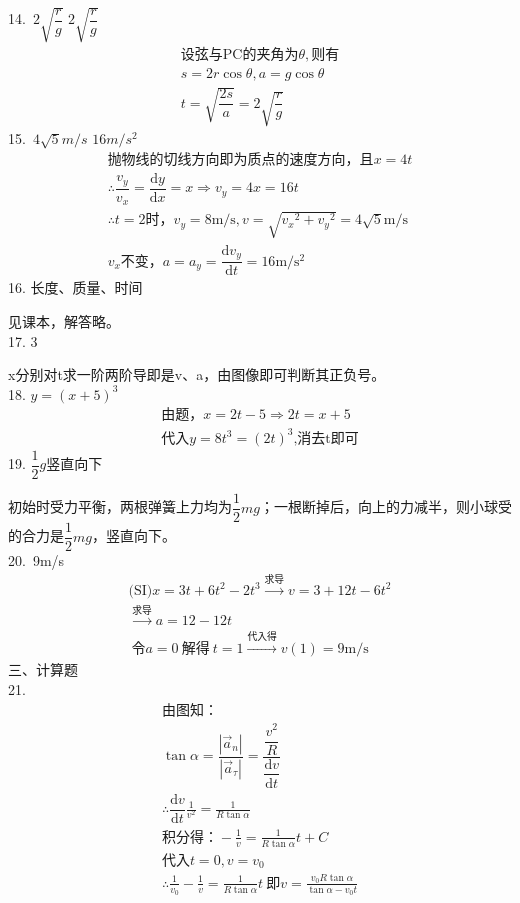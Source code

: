 \documentclass[a4paper,fleqn,twocolumn]{ctexart}
\newcommand{\di}[1]{\mathrm{d}#1}%
\newcommand{\dy}[2]{\dfrac{\di{#1}}{\di{#2}}}%
\begin{document}
		14.\ $2\sqrt{\dfrac{r}{g}}$ \qquad $2\sqrt{\dfrac{r}{g}}$
		\vspace{-0.5em}
		\begin{gather*}
		\text{设弦与PC的夹角为}\theta,\text{则有}\\
		s=2r\cos\theta,a=g\cos\theta\\
		t=\sqrt{\dfrac{2s}{a}}=2\sqrt{\dfrac{r}{g}}
		\end{gather*}
		15.\ $4\sqrt{5}m/s$ \qquad $16m/s^2 $ 
		\vspace{-1em}
		\begin{gather*}	
		\text{抛物线的切线方向即为质点的速度方向，且}x=4t\\
		\therefore \dfrac{v_y}{v_x}=\dy{y}{x}=x\Rightarrow v_y=4x=16t\\
		\therefore t=2\text{时，}v_y=8\mathrm{m/s},
		v=\sqrt{{v_x}^2+{v_y}^2}=4\sqrt{5}\mathrm{m/s}\\
		v_x\text{不变，}a=a_y=\dy{v_y}{t}=16\mathrm{m/s^2}
		\end{gather*}
		16. 长度、质量、时间\par
		见课本，解答略。\\
		17. 3\par
		x分别对t求一阶两阶导即是v、a，由图像即可判断其正负号。\\
		18. $y={(x+5)}^3$
		\vspace{-1em}
		\begin{gather*}\text{由题，}x=2t-5\Rightarrow 2t=x+5\\
		\text{代入}y=8t^3={(2t)}^3\text{,消去t即可}
		\end{gather*}	
		19. $\dfrac{1}{2}g$\qquad 竖直向下\par
		初始时受力平衡，两根弹簧上力均为$\dfrac{1}{2}mg$；一根断掉后，向上的力减半，则小球受的合力是$\dfrac{1}{2}mg$，竖直向下。\\
		20.\ 9m/s 
		\vspace{-1em}
		\begin{gather*}\text{(SI)} x=3t+6t^2-2t^3\xrightarrow{\text{求导}}v=3+12t-6t^2\\
		\xrightarrow{\text{求导}}a=12-12t\\\
		令a=0\ \text{解得}\ t=1\xrightarrow{\text{代入得}} v(1)=9\mathrm{m/s}
		\end{gather*}
		三、计算题\\
		21.
		\begin{gather*}
			\text{由图知：}\\
			\tan\alpha=\dfrac{|\vec{a}_n|}{|\vec{a}_\tau|}=\dfrac{\dfrac{v^2}{R}}{\dy{v}{t}}\\
			\therefore \dy{v}{t}\frac{1}{v^2}=\frac{1}{R\tan\alpha}\\
			\text{积分得：}-\frac{1}{v}=\frac{1}{R\tan\alpha}t+C\\
			\text{代入}t=0,v=v_0\\
			\therefore \frac{1}{v_0}-\frac{1}{v}=\frac{1}{R\tan\alpha}t
			\ \text{即}v=\frac{v_0R\tan\alpha}{\tan\alpha-v_0t}
		\end{gather*}
\end{document}
